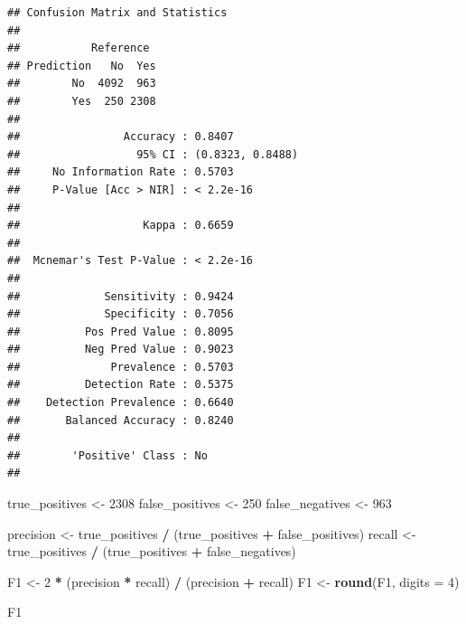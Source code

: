 \documentclass[]{article}
\newenvironment{Shaded}{\begin{snugshade}}{\end{snugshade}}
\newcommand{\DataTypeTok}[1]{\textcolor[rgb]{0.13,0.29,0.53}{#1}}
\newcommand{\DecValTok}[1]{\textcolor[rgb]{0.00,0.00,0.81}{#1}}
\newcommand{\KeywordTok}[1]{\textcolor[rgb]{0.13,0.29,0.53}{\textbf{#1}}}
\newcommand{\NormalTok}[1]{#1}
\newcommand{\OperatorTok}[1]{\textcolor[rgb]{0.81,0.36,0.00}{\textbf{#1}}}
\newcommand{\StringTok}[1]{\textcolor[rgb]{0.31,0.60,0.02}{#1}}
\begin{document}
\begin{Shaded}
\end{Shaded}

\begin{verbatim}
## Confusion Matrix and Statistics
## 
##           Reference
## Prediction   No  Yes
##        No  4092  963
##        Yes  250 2308
##                                           
##                Accuracy : 0.8407          
##                  95% CI : (0.8323, 0.8488)
##     No Information Rate : 0.5703          
##     P-Value [Acc > NIR] : < 2.2e-16       
##                                           
##                   Kappa : 0.6659          
##                                           
##  Mcnemar's Test P-Value : < 2.2e-16       
##                                           
##             Sensitivity : 0.9424          
##             Specificity : 0.7056          
##          Pos Pred Value : 0.8095          
##          Neg Pred Value : 0.9023          
##              Prevalence : 0.5703          
##          Detection Rate : 0.5375          
##    Detection Prevalence : 0.6640          
##       Balanced Accuracy : 0.8240          
##                                           
##        'Positive' Class : No              
## 
\end{verbatim}

\vspace{3mm}

\begin{Shaded}
\begin{Highlighting}[]
\NormalTok{true_positives <-}\StringTok{ }\DecValTok{2308}
\NormalTok{false_positives <-}\StringTok{ }\DecValTok{250}
\NormalTok{false_negatives <-}\StringTok{ }\DecValTok{963}

\NormalTok{precision <-}\StringTok{ }\NormalTok{true_positives }\OperatorTok{/}\StringTok{ }\NormalTok{(true_positives }\OperatorTok{+}\StringTok{ }\NormalTok{false_positives)}
\NormalTok{recall <-}\StringTok{ }\NormalTok{true_positives }\OperatorTok{/}\StringTok{ }\NormalTok{(true_positives }\OperatorTok{+}\StringTok{ }\NormalTok{false_negatives)}

\NormalTok{F1 <-}\StringTok{ }\DecValTok{2} \OperatorTok{*}\StringTok{ }\NormalTok{(precision }\OperatorTok{*}\StringTok{ }\NormalTok{recall) }\OperatorTok{/}\StringTok{ }\NormalTok{(precision }\OperatorTok{+}\StringTok{ }\NormalTok{recall)}
\NormalTok{F1 <-}\StringTok{ }\KeywordTok{round}\NormalTok{(F1, }\DataTypeTok{digits =} \DecValTok{4}\NormalTok{)}

\NormalTok{F1}
\end{Highlighting}
\end{Shaded}
\end{document}
